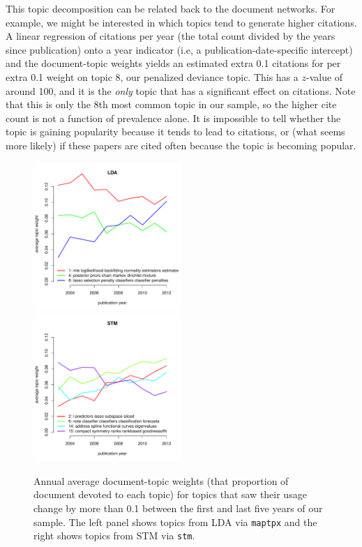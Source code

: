\documentclass[12pt]{article}
\begin{document}
This topic decomposition can be related back to the document networks.  For example, we might be interested in which topics tend to generate higher citations.  A linear regression of citations per year (the total count divided by the years since publication) onto a year indicator (i.e, a publication-date-specific intercept) and the document-topic weights yields an estimated extra 0.1 citations for  per extra 0.1 weight  on topic 8, our penalized deviance topic. This has a $z$-value of around 100, and it is the {\it only} topic that has a significant effect on citations.   Note that this is only the 8th most common topic in our sample, so the higher cite count is not a function of prevalence alone.  It is impossible to tell whether the topic is gaining popularity because it tends to lead to citations, or (what seems more likely) if these papers are cited often because the topic is becoming popular.

\begin{figure}
\includegraphics[width=0.5\textwidth]{lda}
\includegraphics[width=0.5\textwidth]{stm}
\caption{\label{fig:topics} Annual average document-topic weights (that proportion of document devoted to each topic) for topics that saw their usage change by more than 0.1 between the first and last five years of our sample.  The left panel shows  topics from LDA via {\tt maptpx} and the right shows topics from STM via {\tt stm}. }
\end{figure}
\end{document}
